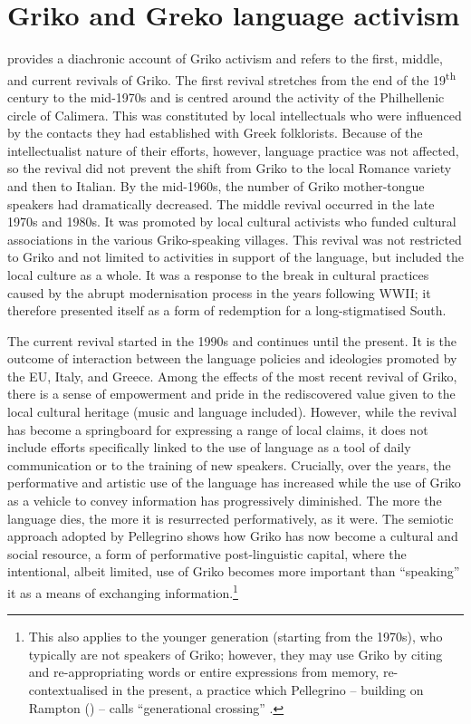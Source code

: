 \documentclass[output=paper,hidelinks]{langscibook}
\begin{document}
\section{Griko and Greko language activism}
\largerpage
\citet{Pellegrino2016a, Pellegrino2021} provides a diachronic account of Griko activism and refers to the first, middle, and current revivals of Griko. The first revival stretches from the end of the 19\textsuperscript{th} century to the mid-1970s and is centred around the activity of the Philhellenic circle of Calimera. This was constituted by local intellectuals who were influenced by the contacts they had established with Greek folklorists. Because of the intellectualist nature of their efforts, however, language practice was not affected, so the revival did not prevent the shift from Griko to the local Romance variety and then to Italian. By the mid-1960s, the number of Griko mother-tongue speakers had dramatically decreased. The middle revival occurred in the late 1970s and 1980s. It was promoted by local cultural activists who funded cultural associations in the various Griko-speaking villages. This revival was not restricted to Griko and not limited to activities in support of the language, but included the local culture as a whole. It was a response to the break in cultural practices caused by the abrupt modernisation process in the years following WWII; it therefore presented itself as a form of redemption for a long-stigmatised South. 



The current revival started in the 1990s and continues until the present. It is the outcome of interaction between the language policies and ideologies promoted by the EU, Italy, and Greece. Among the effects of the most recent revival of Griko, there is a sense of empowerment and pride in the rediscovered value given to the local cultural heritage (music and language included). However, while the revival has become a springboard for expressing a range of local claims, it does not include efforts specifically linked to the use of language as a tool of daily communication or to the training of new speakers. Crucially, over the years, the performative and artistic use of the language has increased while the use of Griko as a vehicle to convey information has progressively diminished. The more the language dies, the more it is resurrected performatively, as it were. The semiotic approach adopted by Pellegrino shows how Griko has now become a cultural and social resource, a form of performative post-linguistic capital, where the intentional, albeit limited, use of Griko becomes more important than ``speaking'' it as a means of exchanging information.\footnote{ \textrm{This also applies to the younger generation (starting from the 1970s), who typically are not speakers of Griko; however, they may use Griko by citing and re-appropriating words or entire expressions from memory, re-contextualised in the present, a practice which Pellegrino – building on Rampton (\citeyear{Rampton1995}) – calls ``generational crossing'' \citep{Pellegrino2021}.}} 
\end{document}
